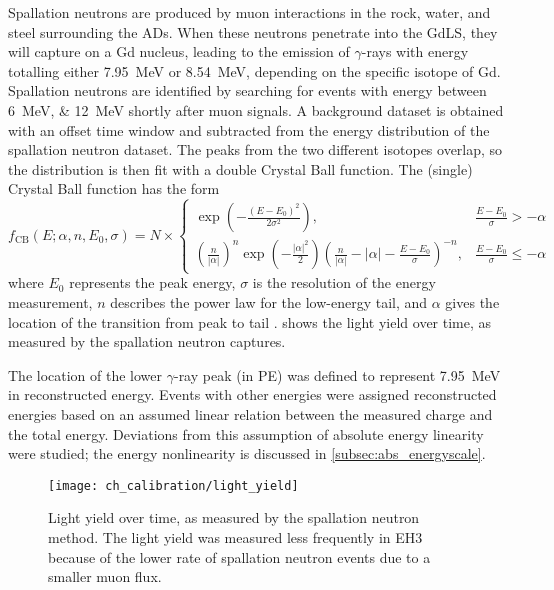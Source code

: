 Spallation neutrons are produced by muon interactions in the rock,
water, and steel surrounding the ADs.
When these neutrons penetrate into the GdLS,
they will capture on a Gd nucleus, leading to the emission of $\gamma$-rays
with energy totalling either \SI{7.95}{\MeV} or \SI{8.54}{\MeV},
depending on the specific isotope of Gd.
Spallation neutrons are identified by searching for events
with energy between \SIlist{6;12}{\MeV} shortly after muon signals.
A background dataset is obtained with an offset time window
and subtracted from the energy distribution of the spallation neutron dataset.
The peaks from the two different isotopes overlap,
so the distribution is then fit with a double Crystal Ball function.
The (single) Crystal Ball function has the form
\begin{equation}\label{eq:crystal_ball}
    f_\text{CB}(E;\alpha, n, E_0, \sigma) = N \times \begin{cases}
        \exp\left(-\frac{(E-E_0)^2}{2\sigma^2}\right),
            & \frac{E-E_0}{\sigma} > -\alpha \\
        \left(\frac{n}{|\alpha|}\right)^n \exp\left(-\frac{|\alpha|^2}{2}\right)
        \left(\frac{n}{|\alpha|} - |\alpha| - \frac{E-E_0}{\sigma}\right)^{-n},
            & \frac{E-E_0}{\sigma} \leq -\alpha
    \end{cases}
\end{equation}
where $E_0$ represents the peak energy,
$\sigma$ is the resolution of the energy measurement,
$n$ describes the power law for the low-energy tail,
and $\alpha$ gives the location of the transition from peak to tail \cite{cbfunction}.
 shows the light yield over time,
as measured by the spallation neutron captures.

The location of the lower $\gamma$-ray peak (in PE)
was defined to represent \SI{7.95}{\MeV} in reconstructed energy.
Events with other energies were assigned reconstructed energies
based on an assumed linear relation between the measured charge
and the total energy.
Deviations from this assumption of absolute energy linearity were studied;
the energy nonlinearity is discussed in \cref{subsec:abs_energyscale}.

\begin{figure}
    \centering
    \texttt{[image: ch\_calibration/light\_yield]}
    \caption{
        Light yield over time, as measured by the spallation neutron method.
        The light yield was measured less frequently in EH3
        because of the lower rate of spallation neutron events
        due to a smaller muon flux.
    }
    \label{fig:lightyield}
\end{figure}

